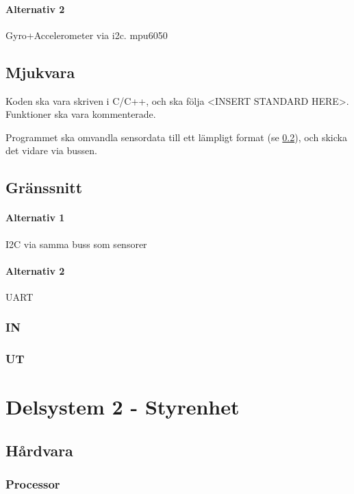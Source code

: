 \documentclass[a4paper,11pt]{article}
\begin{document}
\paragraph{Alternativ 2}
Gyro+Accelerometer via i2c. mpu6050 %

\subsection{Mjukvara}

Koden ska vara skriven i C/C++, och ska följa <INSERT STANDARD HERE>. Funktioner ska vara kommenterade.

Programmet ska omvandla sensordata till ett lämpligt format (se \ref{ssec:sensorInterface}), och skicka det vidare via bussen.

\subsection{Gränssnitt} \label{ssec:sensorInterface}

\paragraph{Alternativ 1}
I2C via samma buss som sensorer

\paragraph{Alternativ 2}
UART


\subsubsection{IN}

\subsubsection{UT}



\section{Delsystem 2 - Styrenhet}

\subsection{Hårdvara}

\subsubsection{Processor}
\end{document}
